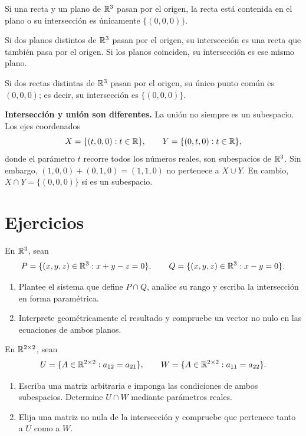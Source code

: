 \documentclass[compacto,10pt]{pubciencias-notas}
\begin{document}
\begin{obs}
    Si una recta y un plano de $\R^3$ pasan por el origen, la recta está
    contenida en el plano o su intersección es únicamente $\{(0,0,0)\}$.

    Si dos planos distintos de $\R^3$ pasan por el origen, su intersección
    es una recta que también pasa por el origen. Si los planos coinciden,
    su intersección es ese mismo plano.

    Si dos rectas distintas de $\R^3$ pasan por el origen, su único
    punto común es $(0,0,0)$; es decir, su intersección es $\{(0,0,0)\}$.
\end{obs}

\begin{advertencia}
    \textbf{Intersección y unión son diferentes.}
    La unión no siempre es un subespacio. Los ejes coordenados
    \[
        X=\{(t,0,0):t\in\R\},\qquad
        Y=\{(0,t,0):t\in\R\},
    \]
    donde el parámetro $t$ recorre todos los números reales, son
    subespacios de $\R^3$. Sin embargo,
    $(1,0,0)+(0,1,0)=(1,1,0)$ no pertenece a $X\cup Y$.
    En cambio, $X\cap Y=\{(0,0,0)\}$ sí es un subespacio.
\end{advertencia}

\newpage
\section{Ejercicios}

\begin{ejer}
    En $\R^3$, sean
    \[
        P=\{(x,y,z)\in\R^3:x+y-z=0\},\qquad
        Q=\{(x,y,z)\in\R^3:x-y=0\}.
    \]
    \begin{enumerate}
        \item Plantee el sistema que define $P\cap Q$, analice su rango
              y escriba la intersección en forma paramétrica.
        \item Interprete geométricamente el resultado y compruebe un
              vector no nulo en las ecuaciones de ambos planos.
    \end{enumerate}
\end{ejer}

\begin{ejer}
    En $\Mat[\R]{2}{2}$, sean
    \[
        U=\{A\in\Mat[\R]{2}{2}:a_{12}=a_{21}\},\qquad
        W=\{A\in\Mat[\R]{2}{2}:a_{11}=a_{22}\}.
    \]
    \begin{enumerate}
        \item Escriba una matriz arbitraria e imponga las condiciones
              de ambos subespacios. Determine $U\cap W$ mediante
              parámetros reales.
        \item Elija una matriz no nula de la intersección y compruebe
              que pertenece tanto a $U$ como a $W$.
    \end{enumerate}
\end{ejer}
\end{document}
